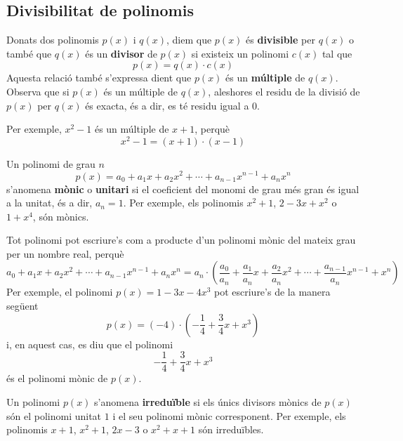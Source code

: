 \subsection{Divisibilitat de polinomis}

Donats dos polinomis $p(x)$ i $q(x)$, diem que $p(x)$ és \textbf{divisible} per $q(x)$ o també que $q(x)$ és un \textbf{divisor} de $p(x)$ si
existeix un polinomi $c(x)$ tal que\begin{equation*}
p(x)=q(x)\cdot c(x)
\end{equation*}Aquesta relació també s'expressa dient que $p(x)$ és un \textbf{múltiple} de $q(x)$. Observa que si $p(x)$ és un múltiple de $q(x)$,
aleshores el residu de la divisió de $p(x)$ per $q(x)$ és exacta, és a
dir, es té residu igual a $0$.

Per exemple, $x^{2}-1$ és un múltiple de $x+1$, perquè\begin{equation*}
x^{2}-1=(x+1)\cdot (x-1)
\end{equation*}

Un polinomi de grau $n$
\begin{equation*}
p(x)=a_{0}+a_{1}x+a_{2}x^{2}+\cdots +a_{n-1}x^{n-1}+a_{n}x^{n}
\end{equation*}s’anomena \textbf{mònic} o \textbf{unitari} si el coeficient del
monomi de grau més gran és igual a la unitat, és a dir, $a_{n}=1$. Per exemple, els polinomis $x^{2}+1$, $2-3x+x^{2}$ o $1+x^{4}$, són mònics.

Tot polinomi pot escriure's com a producte d'un polinomi mònic del
mateix grau per un nombre real, perquè\begin{equation*}
a_{0}+a_{1}x+a_{2}x^{2}+\cdots +a_{n-1}x^{n-1}+a_{n}x^{n}=a_{n}\cdot \left(
\frac{a_{0}}{a_{n}}+\frac{a_{1}}{a_{n}}x+\frac{a_{2}}{a_{n}}x^{2}+\cdots +\frac{a_{n-1}}{a_{n}}x^{n-1}+x^{n}\right)
\end{equation*}
Per exemple, el polinomi $p(x)=1-3x-4x^{3}$ pot escriure's de la manera següent\begin{equation*}
p(x)=\left( -4\right) \cdot \left( -\frac{1}{4}+\frac{3}{4}x+x^{3}\right)
\end{equation*}i, en aquest cas, es diu que el polinomi\begin{equation*}
-\frac{1}{4}+\frac{3}{4}x+x^{3}
\end{equation*}és el polinomi mònic de $p(x)$.

Un polinomi $p(x)$ s’anomena \textbf{irreduïble} si els únics
divisors mònics de $p(x)$ són el polinomi unitat $1$ i el seu polinomi mònic corresponent. Per exemple, els polinomis $x+1$, $x^{2}+1$, $2x-3$ o $x^{2}+x+1$ són irreduïbles.

